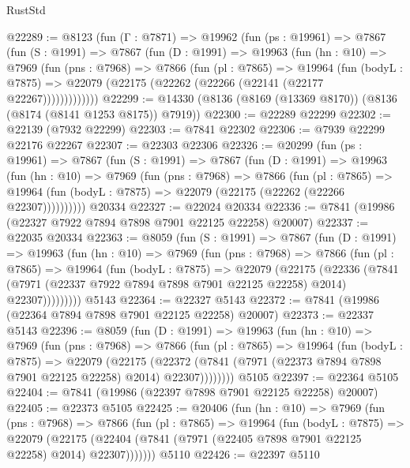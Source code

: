 \begin{lexlean}{RustStd}
\begin{coremodule}
@22289 := @8123
    (fun (Γ : @7871) =>
    @19962
      (fun (ps : @19961) =>
      @7867
        (fun (S : @1991) =>
        @7867
          (fun (D : @1991) =>
          @19963
            (fun (hn : @10) =>
            @7969
              (fun (pns : @7968) =>
              @7866
                (fun (pl : @7865) =>
                @19964
                  (fun (bodyL : @7875) =>
                  @22079 (@22175 (@22262 (@22266 (@22141 (@22177 @22267)))))))))))))
@22299 := @14330 (@8136 (@8169 (@13369 @8170)) (@8136 (@8174 (@8141 @1253 @8175)) @7919))
@22300 := @22289 @22299
@22302 := @22139 (@7932 @22299)
@22303 := @7841 @22302
@22306 := @7939 @22299 @22176 @22267
@22307 := @22303 @22306
@22326 := @20299
    (fun (ps : @19961) =>
    @7867
      (fun (S : @1991) =>
      @7867
        (fun (D : @1991) =>
        @19963
          (fun (hn : @10) =>
          @7969
            (fun (pns : @7968) =>
            @7866
              (fun (pl : @7865) =>
              @19964 (fun (bodyL : @7875) => @22079 (@22175 (@22262 (@22266 @22307))))))))))
    @20334
@22327 := @22024 @20334
@22336 := @7841 (@19986 (@22327 @7922 @7894 @7898 @7901 @22125 @22258) @20007)
@22337 := @22035 @20334
@22363 := @8059
    (fun (S : @1991) =>
    @7867
      (fun (D : @1991) =>
      @19963
        (fun (hn : @10) =>
        @7969
          (fun (pns : @7968) =>
          @7866
            (fun (pl : @7865) =>
            @19964
              (fun (bodyL : @7875) =>
              @22079
                (@22175
                  (@22336
                    (@7841
                      (@7971 (@22337 @7922 @7894 @7898 @7901 @22125 @22258) @2014)
                      @22307)))))))))
    @5143
@22364 := @22327 @5143
@22372 := @7841 (@19986 (@22364 @7894 @7898 @7901 @22125 @22258) @20007)
@22373 := @22337 @5143
@22396 := @8059
    (fun (D : @1991) =>
    @19963
      (fun (hn : @10) =>
      @7969
        (fun (pns : @7968) =>
        @7866
          (fun (pl : @7865) =>
          @19964
            (fun (bodyL : @7875) =>
            @22079
              (@22175
                (@22372 (@7841 (@7971 (@22373 @7894 @7898 @7901 @22125 @22258) @2014) @22307))))))))
    @5105
@22397 := @22364 @5105
@22404 := @7841 (@19986 (@22397 @7898 @7901 @22125 @22258) @20007)
@22405 := @22373 @5105
@22425 := @20406
    (fun (hn : @10) =>
    @7969
      (fun (pns : @7968) =>
      @7866
        (fun (pl : @7865) =>
        @19964
          (fun (bodyL : @7875) =>
          @22079
            (@22175 (@22404 (@7841 (@7971 (@22405 @7898 @7901 @22125 @22258) @2014) @22307)))))))
    @5110
@22426 := @22397 @5110

\end{coremodule}
\end{lexlean}

